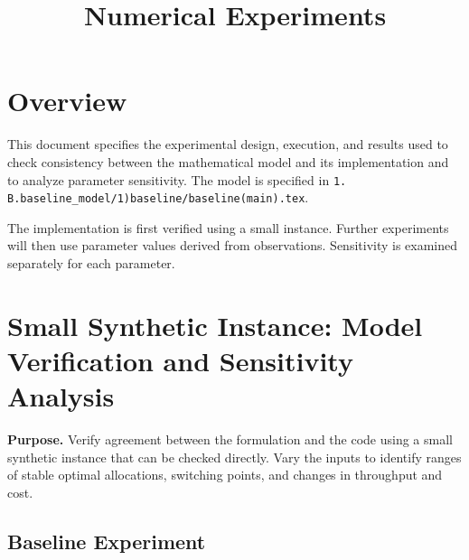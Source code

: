 \documentclass[10pt,a4paper]{article}
\title{Numerical Experiments}
\author{}
\date{}
\begin{document}
\maketitle

\begingroup\sloppy
\section{Overview}

This document specifies the experimental design, execution, and results used to check consistency between the mathematical model and its implementation and to analyze parameter sensitivity. The model is specified in \texttt{1. B.baseline\_model/1)baseline/baseline(main).tex}.

The implementation is first verified using a small instance. Further experiments will then use parameter values derived from observations. Sensitivity is examined separately for each parameter.

\par\endgroup

\section{Small Synthetic Instance: Model Verification and Sensitivity Analysis}
\label{sec:smallcase}
\textbf{Purpose.} Verify agreement between the formulation and the code using a small synthetic instance that can be checked directly. Vary the inputs to identify ranges of stable optimal allocations, switching points, and changes in throughput and cost.

\subsection{Baseline Experiment}
\end{document}
